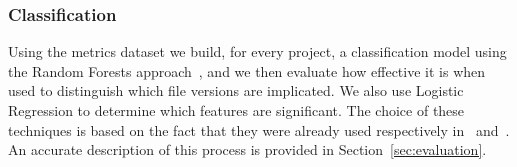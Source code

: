 \subsubsection{Classification}
Using the metrics dataset we build, for every project, a classification model using the Random Forests approach~\cite{breiman2001random}, and we then evaluate how effective it is when used to distinguish which file versions are implicated. We also use Logistic Regression to determine which features are significant. The choice of these techniques is based on the fact that they were already used respectively in~\cite{Greiler:replication} and~\cite{bird:original}. An accurate description of this process is provided in Section~\ref{sec:evaluation}.














